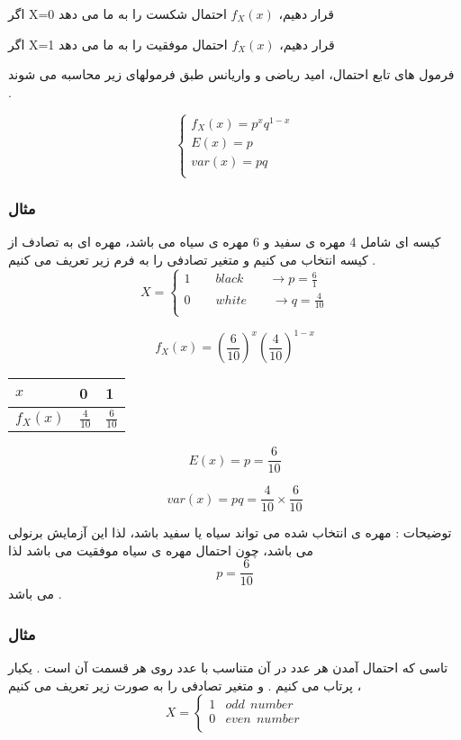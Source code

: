 \documentclass[12pt]{book}
\begin{document}
اگر X=0 قرار دهیم، $f_{X}(x)$ احتمال شکست را به ما می دهد

اگر X=1 قرار دهیم، $f_{X}(x)$ احتمال موفقیت را به ما می دهد

فرمول های تابع احتمال، امید ریاضی و واریانس طبق فرمولهای زیر محاسبه می شوند .

$$
\begin{cases}
f_{X}(x) = p^{x} q^{1-x} \\
E(x) = p \\
var(x) = pq \\
\end{cases}
$$


\subsubsection{مثال}
کیسه ای شامل 4 مهره ی سفید و 6 مهره ی سیاه می باشد، مهره ای به تصادف از کیسه انتخاب می کنیم و متغیر تصادفی را به فرم زیر تعریف می کنیم .
$$
X = 
\begin{cases}
1  \qquad black \qquad \to p = \frac{6}{1} \\
0 \qquad white \qquad \to q = \frac{4}{10} \\
\end{cases}
$$


$$
f_{X}(x) = (\frac{6}{10})^{x} (\frac{4}{10})^{1-x}
$$



\begin{center}
\begin{latin}
\begin{tabular}{ l |  l  l }
  $x$ & 0 & 1 \\
  \hline
  $f_{X}(x)$ & $\frac{4}{10}$ & $\frac{6}{10}$ \\
\end{tabular}
\end{latin}
\end{center}




$$
E(x) = p = \frac{6}{10}
$$

$$
var(x) = pq = \frac{4}{10} \times \frac{6}{10}
$$


توضیحات : مهره ی انتخاب شده می تواند سیاه یا سفید باشد، لذا این آزمایش برنولی می باشد، چون احتمال مهره ی سیاه موفقیت می باشد لذا
$$
p = \frac{6}{10}
$$
می باشد .


\subsubsection{مثال}
تاسی که احتمال آمدن هر عدد در آن متناسب با عدد روی هر قسمت آن است . یکبار پرتاب می کنیم . و متغیر تصادفی را به صورت زیر تعریف می کنیم ، 
$$
X = 
\begin{cases}
1 & odd \:\: number \\
0 & even \:\: number \\
\end{cases}
$$
\end{document}
